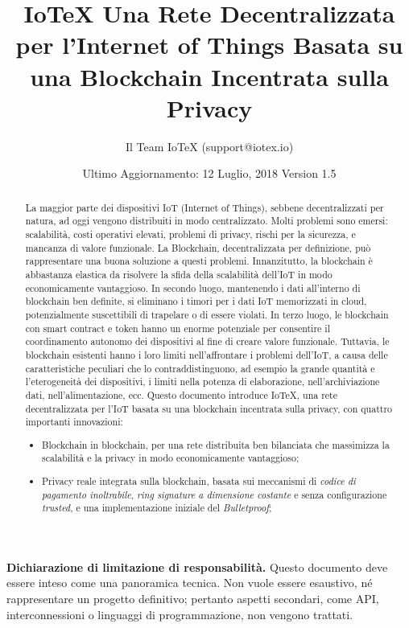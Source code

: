 \documentclass[a4paper,12pt]{article}
\title{
	IoTeX
	\linebreak
	\Large Una Rete Decentralizzata per l'Internet of Things
	\linebreak
	\Large Basata su una Blockchain Incentrata sulla Privacy}
\author{Il Team IoTeX (support@iotex.io)}
\date{Ultimo Aggiornamento: 12 Luglio, 2018
	\linebreak Version 1.5
	}
\begin{document}
\maketitle

\vspace{200pt}


\textbf{Dichiarazione di limitazione di responsabilità.} Questo documento deve essere inteso come una panoramica tecnica. Non vuole essere esaustivo, né rappresentare un progetto definitivo; pertanto aspetti secondari, come API, interconnessioni o linguaggi di programmazione, non vengono trattati.

\pagebreak

\begin{abstract}
	La maggior parte dei dispositivi IoT (Internet of Things), sebbene decentralizzati per natura, ad oggi vengono distribuiti in modo centralizzato. Molti problemi sono emersi: scalabilità, costi operativi elevati, problemi di privacy, rischi per la sicurezza, e mancanza di valore funzionale. La Blockchain, decentralizzata per definizione, può rappresentare una buona soluzione a questi problemi. Innanzitutto, la blockchain è abbastanza elastica da risolvere la sfida della scalabilità dell'IoT in modo economicamente vantaggioso. In secondo luogo, mantenendo i dati all'interno di blockchain ben definite, si eliminano i timori per i dati IoT memorizzati in cloud, potenzialmente suscettibili di trapelare o di essere violati. In terzo luogo, le blockchain con smart contract e token hanno un enorme potenziale per consentire il coordinamento autonomo dei dispositivi al fine di creare valore funzionale. Tuttavia, le blockchain esistenti hanno i loro limiti nell'affrontare i problemi dell'IoT, a causa delle caratteristiche peculiari che lo contraddistinguono, ad esempio la grande quantità e l'eterogeneità dei dispositivi, i limiti nella potenza di elaborazione, nell'archiviazione dati, nell'alimentazione, ecc.
	Questo documento introduce IoTeX, una rete decentralizzata per l'IoT basata su una blockchain incentrata sulla privacy, con quattro importanti innovazioni:

	\begin{itemize}

		\item
		      Blockchain in blockchain, per una rete distribuita ben bilanciata che massimizza la scalabilità e la privacy in modo economicamente vantaggioso;

		\item
		      Privacy reale integrata sulla blockchain, basata sui meccanismi di \emph{codice di pagamento inoltrabile}, \emph{ring signature a dimensione costante} e senza configurazione \emph{trusted}, e una implementazione iniziale del \emph{Bulletproof};


\end{itemize}
\end{abstract}
\end{document}
